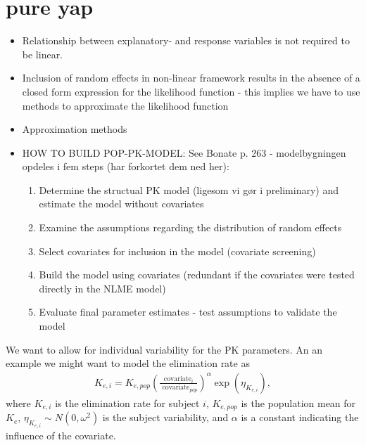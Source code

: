 


\chapter{pure yap}
\begin{itemize}
    \item Relationship between explanatory- and response variables is not required to be linear.
    \item Inclusion of random effects in non-linear framework results in the absence of a closed form expression for the likelihood function - this implies we have to use methods to approximate the likelihood function
    \item Approximation methods
    \item HOW TO BUILD POP-PK-MODEL: See Bonate p. 263 - modelbygningen opdeles i fem steps (har forkortet dem ned her):
    \begin{enumerate}
        \item Determine the structual PK model (ligesom vi gør i preliminary) and estimate the model without covariates
        \item Examine the assumptions regarding the distribution of random effects
        \item Select covariates for inclusion in the model (covariate screening)
        \item Build the model using covariates (redundant if the covariates were tested directly in the NLME model)
        \item Evaluate final parameter estimates - test assumptions to validate the model
    \end{enumerate}
\end{itemize}
We want to allow for individual variability for the PK parameters. An an example we might want to model the elimination rate as
\begin{align*}
    K_{e,i}=K_{e,pop}\left(\frac{\text{covariate}_i}{\text{ covariate}_{pop}}\right)^{\alpha}\exp({\eta_{K_{e,i}}}), 
\end{align*}
where $K_{e,i}$ is the elimination rate for subject $i$, $K_{e,pop}$ is the population mean for $K_{e}$, $\eta_{K_{e,i}} \sim N(0, \omega^2)$ is the subject variability, and $\alpha$ is a constant indicating the influence of the covariate.


